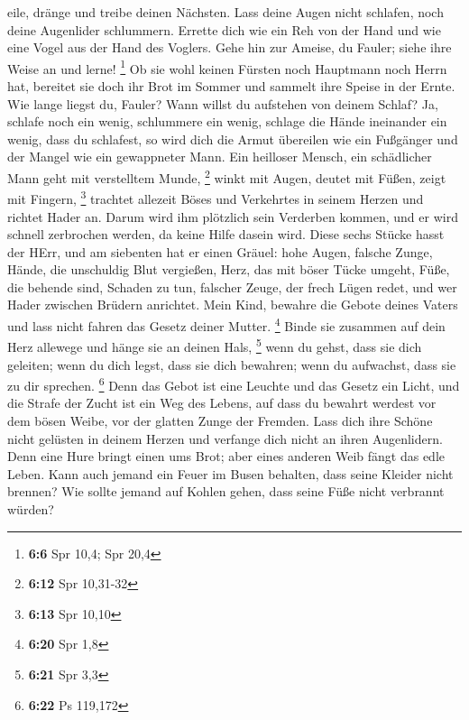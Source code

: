eile, dränge und treibe deinen Nächsten.  Lass deine Augen
nicht schlafen, noch deine Augenlider schlummern.  Errette
dich wie ein Reh von der Hand und wie eine Vogel aus der Hand des
Voglers.  Gehe hin zur Ameise, du Fauler; siehe ihre Weise
an und lerne! \footnote{\textbf{6:6} Spr 10,4; Spr 20,4}  Ob
sie wohl keinen Fürsten noch Hauptmann noch Herrn hat, 
bereitet sie doch ihr Brot im Sommer und sammelt ihre Speise in der
Ernte.  Wie lange liegst du, Fauler? Wann willst du
aufstehen von deinem Schlaf?  Ja, schlafe noch ein wenig,
schlummere ein wenig, schlage die Hände ineinander ein wenig, dass du
schlafest,  so wird dich die Armut übereilen wie ein
Fußgänger und der Mangel wie ein gewappneter Mann.  Ein
heilloser Mensch, ein schädlicher Mann geht mit verstelltem Munde,
\footnote{\textbf{6:12} Spr 10,31-32}  winkt mit Augen,
deutet mit Füßen, zeigt mit Fingern, \footnote{\textbf{6:13} Spr 10,10}
 trachtet allezeit Böses und Verkehrtes in seinem Herzen
und richtet Hader an.  Darum wird ihm plötzlich sein
Verderben kommen, und er wird schnell zerbrochen werden, da keine Hilfe
dasein wird.  Diese sechs Stücke hasst der HErr, und am
siebenten hat er einen Gräuel:  hohe Augen, falsche Zunge,
Hände, die unschuldig Blut vergießen,  Herz, das mit böser
Tücke umgeht, Füße, die behende sind, Schaden zu tun, 
falscher Zeuge, der frech Lügen redet, und wer Hader zwischen Brüdern
anrichtet.  Mein Kind, bewahre die Gebote deines Vaters und
lass nicht fahren das Gesetz deiner Mutter. \footnote{\textbf{6:20} Spr
  1,8}  Binde sie zusammen auf dein Herz allewege und hänge
sie an deinen Hals, \footnote{\textbf{6:21} Spr 3,3}  wenn
du gehst, dass sie dich geleiten; wenn du dich legst, dass sie dich
bewahren; wenn du aufwachst, dass sie zu dir sprechen. \footnote{\textbf{6:22}
  Ps 119,172}  Denn das Gebot ist eine Leuchte und das
Gesetz ein Licht, und die Strafe der Zucht ist ein Weg des Lebens,
 auf dass du bewahrt werdest vor dem bösen Weibe, vor der
glatten Zunge der Fremden.  Lass dich ihre Schöne nicht
gelüsten in deinem Herzen und verfange dich nicht an ihren Augenlidern.
 Denn eine Hure bringt einen ums Brot; aber eines anderen
Weib fängt das edle Leben.  Kann auch jemand ein Feuer im
Busen behalten, dass seine Kleider nicht brennen?  Wie
sollte jemand auf Kohlen gehen, dass seine Füße nicht verbrannt würden?
